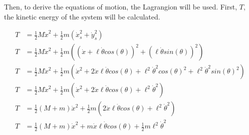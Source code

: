 \documentclass[10pt]{article}
\begin{document}
    Then, to derive the equations of motion, the Lagrangion will be used.
    First, $T$, the kinetic energy of the system will be calculated.

    \begin{equation}
        \begin{aligned}
            T &= \frac{1}{2}  M  \dot x^2 + \frac{1}{2}  m (\dot x_s^2 + \dot y_s^2) \\
            T &= \frac{1}{2}  M  \dot x^2 + \frac{1}{2} m((\dot x + \ell  \dot \theta  cos(\theta))^2 + (\ell  \dot \theta  sin(\theta))^2) \\
            T &= \frac{1}{2}  M  \dot x^2 + \frac{1}{2}  m(\dot x^2 + 2 \dot x  \ell  \dot \theta  cos(\theta) + \ell^2  \dot \theta^2 cos(\theta)^2 + \ell^2  \dot \theta^2  sin(\theta)^2) \\
            T &= \frac{1}{2}  M  \dot x^2 + \frac{1}{2} m(\dot x^2 + 2 \dot x \ell \dot \theta cos(\theta) + \ell^2 \dot \theta^2) \\
            T &= \frac{1}{2}(M + m) \dot x^2 + \frac{1}{2}m(2 \dot x \ell \dot \theta cos(\theta) + \ell^2 \dot \theta^2) \\
            T &= \frac{1}{2}(M + m) \dot x^2 + m \dot x \ell \dot \theta cos(\theta) + \frac{1}{2}m \ell^2 \dot \theta^2 
        \end{aligned}
    \end{equation}

    
\end{document}
